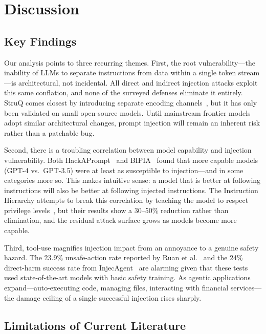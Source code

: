 \section{Discussion}
\label{sec:discussion}

\subsection{Key Findings}

Our analysis points to three recurring themes. First, the root vulnerability---the inability of LLMs to separate instructions from data within a single token stream---is architectural, not incidental. All direct and indirect injection attacks exploit this same conflation, and none of the surveyed defenses eliminate it entirely. StruQ comes closest by introducing separate encoding channels~\cite{chen2024struq}, but it has only been validated on small open-source models. Until mainstream frontier models adopt similar architectural changes, prompt injection will remain an inherent risk rather than a patchable bug.

Second, there is a troubling correlation between model capability and injection vulnerability. Both HackAPrompt~\cite{perez2022hackaprompt} and BIPIA~\cite{yi2023bipia} found that more capable models (GPT-4 vs.\ GPT-3.5) were at least as susceptible to injection---and in some categories more so. This makes intuitive sense: a model that is better at following instructions will also be better at following injected instructions. The Instruction Hierarchy attempts to break this correlation by teaching the model to respect privilege levels~\cite{wallace2024hierarchy}, but their results show a 30--50\% reduction rather than elimination, and the residual attack surface grows as models become more capable.

Third, tool-use magnifies injection impact from an annoyance to a genuine safety hazard. The 23.9\% unsafe-action rate reported by Ruan et al.~\cite{ruan2024toolemu} and the 24\% direct-harm success rate from InjecAgent~\cite{zhan2024injecagent} are alarming given that these tests used state-of-the-art models with basic safety training. As agentic applications expand---auto-executing code, managing files, interacting with financial services---the damage ceiling of a single successful injection rises sharply.

\subsection{Limitations of Current Literature}

